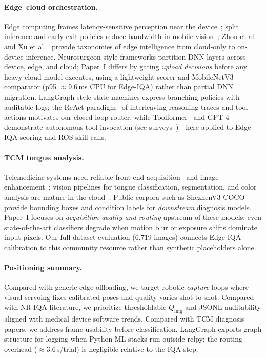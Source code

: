 \paragraph{Edge--cloud orchestration.}
Edge computing frames latency-sensitive perception near the device~\cite{wang2014edge}; split inference and early-exit policies reduce bandwidth in mobile vision~\cite{kang2017neurosurgeon,li2018edge}; Zhou et al.~\cite{zhou2019edge} and Xu et al.~\cite{xu2021a} provide taxonomies of edge intelligence from cloud-only to on-device inference.
Neurosurgeon-style frameworks partition DNN layers across device, edge, and cloud; Paper~I differs by gating \emph{upload decisions} before any heavy cloud model executes, using a lightweight scorer and MobileNetV3~\cite{howard2019mobilenetv3} comparator (p95 $\approx$9.6\,ms CPU for Edge-IQA) rather than partial DNN migration.
LangGraph-style state machines express branching policies with auditable logs; the ReAct paradigm~\cite{yao2023react} of interleaving reasoning traces and tool actions motivates our closed-loop router, while Toolformer~\cite{schick2023toolformer} and GPT-4~\cite{openai2023gpt-4} demonstrate autonomous tool invocation (see surveys~\cite{wang2024a})---here applied to Edge-IQA scoring and ROS skill calls.

\paragraph{TCM tongue analysis.}
Telemedicine systems need reliable front-end acquisition~\cite{chen2021telemed} and image enhancement~\cite{deng2026op4ksr}; vision pipelines for tongue classification, segmentation, and color analysis are mature in the cloud~\cite{zhang2020tongue,qi2016tongue,huang2015tcn}.
Public corpora such as ShezhenV3-COCO provide bounding boxes and condition labels for \emph{downstream} diagnosis models.
Paper~I focuses on \emph{acquisition quality and routing} upstream of these models: even state-of-the-art classifiers degrade when motion blur or exposure shifts dominate input pixels.
Our full-dataset evaluation (6{,}719 images) connects Edge-IQA calibration to this community resource rather than synthetic placeholders alone.

\paragraph{Positioning summary.}
Compared with generic edge offloading, we target robotic \emph{capture} loops where visual servoing fixes calibrated poses and quality varies shot-to-shot.
Compared with NR-IQA literature, we prioritize thresholdable $Q_{\mathrm{img}}$ and JSONL auditability aligned with medical device software trends.
Compared with TCM diagnosis papers, we address frame usability before classification.
LangGraph exports graph structure for logging when Python ML stacks run outside rclpy; the routing overhead ($\approx$3.6\,\textmu s/trial) is negligible relative to the IQA step.

